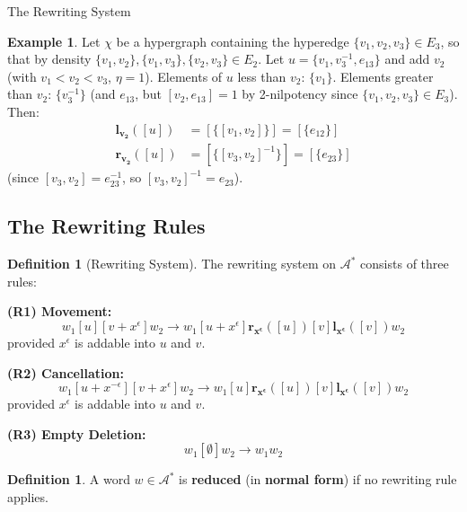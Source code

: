\documentclass{article}
\theoremstyle{definition}
\newtheorem{definition}[theorem]{Definition}
\newtheorem{example}[theorem]{Example}
\theoremstyle{remark}
\theoremstyle{theorem}
\theoremstyle{definition}
\begin{document}
\begin{section}{The Rewriting System}
\begin{example}
Let $\chi$ be a hypergraph containing the hyperedge $\{v_1, v_2, v_3\} \in E_3$,
so that by density $\{v_1,v_2\}, \{v_1,v_3\}, \{v_2,v_3\} \in E_2$.
Let $u = \{v_1, v_3^{-1}, e_{13}\}$ and add $v_2$ (with $v_1 < v_2 < v_3$, $\eta=1$). Elements of $u$ less than $v_2$: $\{v_1\}$. Elements greater than $v_2$: $\{v_3^{-1}\}$ (and $e_{13}$, but $[v_2, e_{13}]=1$ by 2-nilpotency since $\{v_1,v_2,v_3\}\in E_3$). Then:
\begin{align*}
\mathbf{l_{v_2}}([u]) &= [\{[v_1, v_2]\}] = [\{e_{12}\}]\\
\mathbf{r_{v_2}}([u]) &= [\{[v_3, v_2]^{-1}\}] = [\{e_{23}\}]
\end{align*}
(since $[v_3, v_2] = e_{23}^{-1}$, so $[v_3, v_2]^{-1} = e_{23}$).
\end{example}

\subsection{The Rewriting Rules}

\begin{definition}[Rewriting System]\label{def:rewriting}
The rewriting system on $\mathcal{A}^*$ consists of three rules:

\textbf{(R1) Movement:}
$$w_1[u][v+x^{\epsilon}]w_2\rightarrow w_1[u+x^{\epsilon}]\mathbf{r_{x^{\epsilon}}}([u])[v]\mathbf{l_{x^{\epsilon}}}([v])w_2$$
provided $x^{\epsilon}$ is addable into $u$ and $v$.

\textbf{(R2) Cancellation:}
$$w_1[u+x^{-\epsilon}][v+x^{\epsilon}]w_2\rightarrow w_1[u]\mathbf{r_{x^{\epsilon}}}([u])[v]\mathbf{l_{x^{\epsilon}}}([v])w_2$$
provided $x^{\epsilon}$ is addable into $u$ and $v$.

\textbf{(R3) Empty Deletion:}
$$w_1[\emptyset]w_2\rightarrow w_1w_2$$
\end{definition}

\begin{definition}
A word $w \in \mathcal{A}^*$ is \textbf{reduced} (in \textbf{normal form}) if no rewriting rule applies.
\end{definition}

\end{section}
\end{document}
